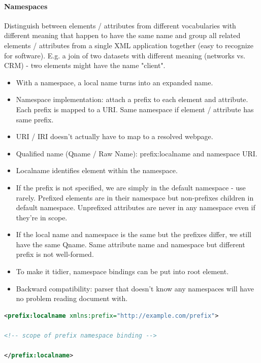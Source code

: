 





\paragraph{Namespaces}
Distinguish between elements / attributes from different vocabularies with different meaning that happen to have the same name and group all related elements / attributes from a single XML application together (easy to recognize for software). E.g. a join of two datasets with different meaning (networks vs. CRM) - two elements might have the name "client".

\begin{itemize}
    \item With a namespace, a local name turns into an expanded name.
    \item Namespace implementation: attach a prefix to each element and attribute. Each prefix is mapped to a URI. Same namespace if element / attribute has same prefix.
    \item URI / IRI doesn't actually have to map to a resolved webpage.
    \item Qualified name (Qname / Raw Name): prefix:localname and namespace URI.
    \item Localname identifies element within the namespace.
    \item If the prefix is not specified, we are simply in the default namespace - use rarely. Prefixed elements are in their namespace but non-prefixes children in default namespace. Unprefixed attributes are never in any namespace even if they're in scope.
    \item If the local name and namespace is the same but the prefixes differ, we still have the same Qname. Same attribute name and namespace but different prefix is not well-formed.
    \item To make it tidier, namespace bindings can be put into root element.
    \item Backward compatibility: parser that doesn't know any namespaces will have no problem reading document with.
\end{itemize}

\begin{lstlisting}[language=XML]
<prefix:localname xmlns:prefix="http://example.com/prefix">

<!-- scope of prefix namespace binding -->

</prefix:localname>
\end{lstlisting}

